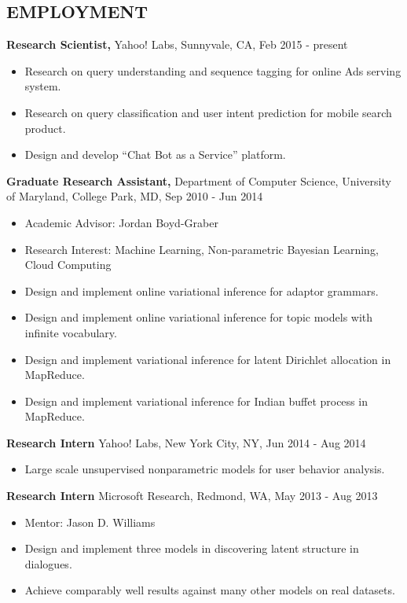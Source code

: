 \documentclass{style/resume}
\begin{document}
\begin{resume}
  \section{EMPLOYMENT} 
  \vspace{0.1in}
  {\bf Research Scientist,} Yahoo! Labs, Sunnyvale, CA, Feb 2015 - present
  \begin{itemize}
  \item Research on query understanding and sequence tagging for
    online Ads serving system.
  \item Research on query classification and user intent prediction
    for mobile search product.
  \item Design and develop ``Chat Bot as a Service'' platform.
  \end{itemize}

  {\bf Graduate Research Assistant,} Department of Computer Science,
  University of Maryland, College Park, MD, Sep 2010 - Jun 2014
  \begin{itemize}
  \item Academic Advisor: Jordan Boyd-Graber
  \item Research Interest: Machine Learning, Non-parametric Bayesian
    Learning, Cloud Computing
  \item Design and implement online variational inference for adaptor grammars.
  \item Design and implement online variational inference for topic models with infinite vocabulary.
  \item Design and implement variational inference for latent Dirichlet allocation in MapReduce.
  \item Design and implement variational inference for Indian buffet process in MapReduce.
  \end{itemize}

  {\bf Research Intern} Yahoo! Labs, New York City, NY, Jun 2014 - Aug 2014
  \begin{itemize}
  \item Large scale unsupervised nonparametric models for user behavior analysis.
  \end{itemize}

  {\bf Research Intern} Microsoft Research, Redmond, WA, May 2013 - Aug 2013
  \begin{itemize}
  \item Mentor: Jason D. Williams
  \item Design and implement three models in discovering latent structure in dialogues.
  \item Achieve comparably well results against many other models on real datasets.
  \end{itemize}


\end{resume}
\end{document}
